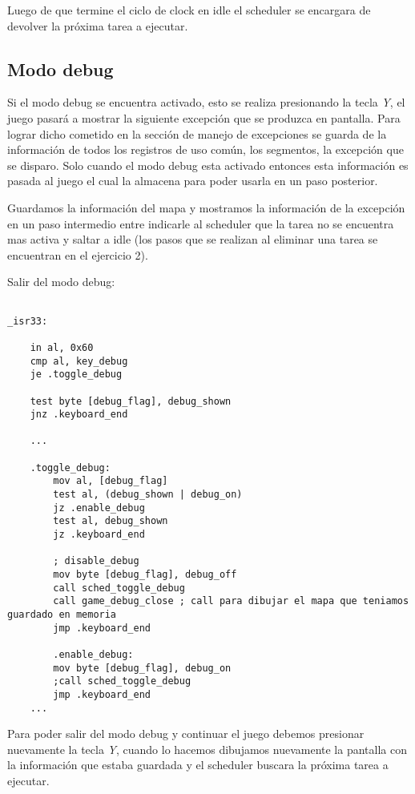 	Luego de que termine el ciclo de clock en idle el scheduler se encargara de devolver la próxima tarea a ejecutar.

	\subsection{Modo debug}
	Si el modo debug se encuentra activado, esto se realiza presionando la tecla \textit{Y}, el juego pasará a mostrar la siguiente excepción que se produzca en pantalla. Para lograr dicho cometido en la sección de manejo de excepciones se guarda de la información de todos los registros de uso común, los segmentos, la excepción que se disparo. Solo cuando el modo debug esta activado entonces esta información es pasada al juego el cual la almacena para poder usarla en un paso posterior.

	Guardamos la información del mapa y mostramos la información de la excepción en un paso intermedio entre indicarle al scheduler que la tarea no se encuentra mas activa y saltar a idle (los pasos que se realizan al eliminar una tarea se encuentran en el ejercicio 2).

	Salir del modo debug:

	\begin{lstlisting}

_isr33:

    in al, 0x60
    cmp al, key_debug
    je .toggle_debug

    test byte [debug_flag], debug_shown
    jnz .keyboard_end

    ...

    .toggle_debug:
        mov al, [debug_flag]
        test al, (debug_shown | debug_on)
        jz .enable_debug
        test al, debug_shown
        jz .keyboard_end

        ; disable_debug
        mov byte [debug_flag], debug_off
        call sched_toggle_debug
        call game_debug_close ; call para dibujar el mapa que teniamos guardado en memoria
        jmp .keyboard_end

        .enable_debug:
        mov byte [debug_flag], debug_on
        ;call sched_toggle_debug
        jmp .keyboard_end
    ...
	\end{lstlisting}

	Para poder salir del modo debug y continuar el juego debemos presionar nuevamente la tecla \textit{Y}, cuando lo hacemos dibujamos nuevamente la pantalla con la información que estaba guardada y el scheduler buscara la próxima tarea a ejecutar.